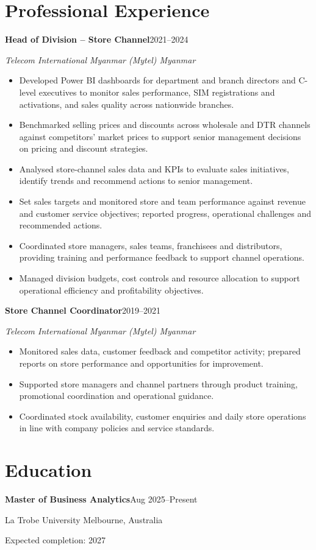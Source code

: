 \documentclass[11pt,a4paper]{article}
\newcommand{\role}[3]{\textbf{#1}\hfill #2\par\textit{#3}\par}
\begin{document}
\section{Professional Experience}
\role{Head of Division -- Store Channel}{2021--2024}{Telecom International Myanmar (Mytel) \textbar{} Myanmar}
\begin{itemize}
\item Developed Power BI dashboards for department and branch directors and C-level executives to monitor sales performance, SIM registrations and activations, and sales quality across nationwide branches.
\item Benchmarked selling prices and discounts across wholesale and DTR channels against competitors' market prices to support senior management decisions on pricing and discount strategies.
\item Analysed store-channel sales data and KPIs to evaluate sales initiatives, identify trends and recommend actions to senior management.
\item Set sales targets and monitored store and team performance against revenue and customer service objectives; reported progress, operational challenges and recommended actions.
\item Coordinated store managers, sales teams, franchisees and distributors, providing training and performance feedback to support channel operations.
\item Managed division budgets, cost controls and resource allocation to support operational efficiency and profitability objectives.
\end{itemize}

\vspace{3pt}
\role{Store Channel Coordinator}{2019--2021}{Telecom International Myanmar (Mytel) \textbar{} Myanmar}
\begin{itemize}
\item Monitored sales data, customer feedback and competitor activity; prepared reports on store performance and opportunities for improvement.
\item Supported store managers and channel partners through product training, promotional coordination and operational guidance.
\item Coordinated stock availability, customer enquiries and daily store operations in line with company policies and service standards.
\end{itemize}

\newpage
\section{Education}
\textbf{Master of Business Analytics}\hfill Aug 2025--Present\par
La Trobe University \textbar{} Melbourne, Australia\par
Expected completion: 2027
\end{document}
